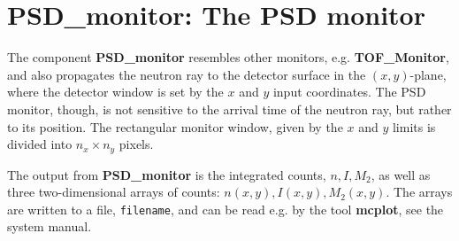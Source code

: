
\section{PSD\_monitor: The PSD monitor}

The component \textbf{PSD\_monitor} resembles other monitors, e.g.
\textbf{TOF\_Monitor}, and also propagates the neutron ray to the detector
surface in the $(x,y)$-plane, where the detector window is set
by the $x$ and $y$ input coordinates.
The PSD monitor, though, is not sensitive to the arrival time
of the neutron ray, but rather to its position.
The rectangular monitor window, given by the $x$ and $y$
limits is divided into $n_x \times n_y$ pixels.

The output from \textbf{PSD\_monitor} is the integrated counts, $n, I, M_2$,
as well as
three two-dimensional arrays of counts: $n(x,y), I(x,y), M_2(x,y)$.
The arrays are written to a file, \verb+filename+, and can be read e.g. by the tool
\textbf{mcplot}, see the system manual.
